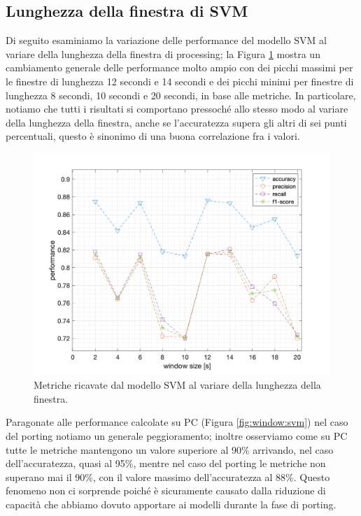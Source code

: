 \subsection{Lunghezza della finestra di SVM}
\label{ssec:lunghezza-della-finestra-hexi}

Di seguito esaminiamo la variazione delle performance del modello SVM al variare della lunghezza della finestra di processing; la Figura \ref{fig:metrics-svm-window-hexi} mostra un cambiamento generale delle performance molto ampio con dei picchi massimi per le finestre di lunghezza 12 secondi e 14 secondi e dei picchi minimi per finestre di lunghezza 8 secondi, 10 secondi e 20 secondi, in base alle metriche. In particolare, notiamo che tutti i risultati si comportano pressoché allo stesso modo al variare della lunghezza della finestra, anche se l'accuratezza supera gli altri di sei punti percentuali, questo è sinonimo di una buona correlazione fra i valori.

\begin{figure}[!htb]
    \centering
    \includegraphics[width=.8\textwidth]{figure/svm_performance.png}
    \caption{Metriche ricavate dal modello SVM al variare della lunghezza della finestra.}
    \label{fig:metrics-svm-window-hexi}
\end{figure}

Paragonate alle performance calcolate su PC (Figura \ref{fig:window:svm}) nel caso del porting notiamo un generale peggioramento; inoltre osserviamo come su PC tutte le metriche mantengono un valore superiore al 90\% arrivando, nel caso dell'accuratezza, quasi al 95\%, mentre nel caso del porting le metriche non superano mai il 90\%, con il valore massimo dell'accuratezza al 88\%. Questo fenomeno non ci sorprende poiché è sicuramente causato dalla riduzione di capacità che abbiamo dovuto apportare ai modelli durante la fase di porting.

